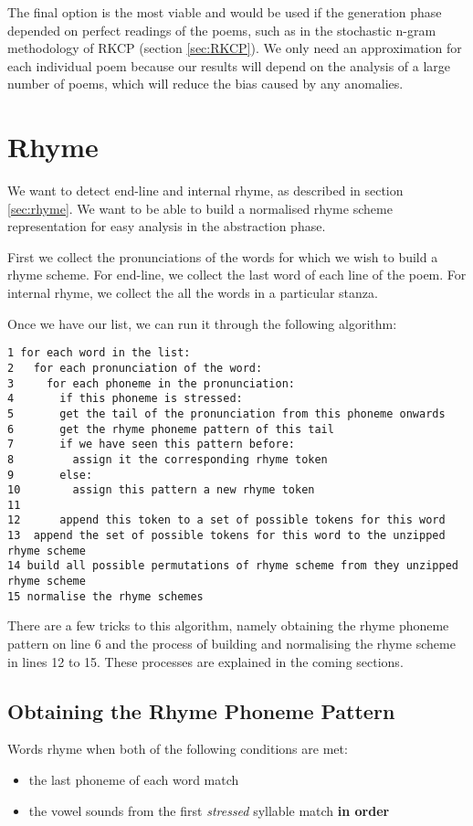 The final option is the most viable and would be used if the generation phase depended on perfect readings of the poems, such as in the stochastic n-gram methodology of RKCP (section \ref{sec:RKCP}). We only need an approximation for each individual poem because our results will depend on the analysis of a large number of poems, which will reduce the bias caused by any anomalies.


\section{Rhyme}

We want to detect end-line and internal rhyme, as described in section \ref{sec:rhyme}. We want to be able to build a normalised rhyme scheme representation for easy analysis in the abstraction phase. 

First we collect the pronunciations of the words for which we wish to build a rhyme scheme. For end-line, we collect the last word of each line of the poem. For internal rhyme, we collect the all the words in a particular stanza.

Once we have our list, we can run it through the following algorithm:

\begin{verbatim}
1 for each word in the list:
2   for each pronunciation of the word:
3     for each phoneme in the pronunciation:
4	    if this phoneme is stressed:
5       get the tail of the pronunciation from this phoneme onwards
6       get the rhyme phoneme pattern of this tail
7       if we have seen this pattern before: 
8         assign it the corresponding rhyme token
9       else:
10        assign this pattern a new rhyme token
11			
12      append this token to a set of possible tokens for this word			
13  append the set of possible tokens for this word to the unzipped rhyme scheme
14 build all possible permutations of rhyme scheme from they unzipped rhyme scheme
15 normalise the rhyme schemes
\end{verbatim}
There are a few tricks to this algorithm, namely obtaining the rhyme phoneme pattern on line 6 and the process of building and normalising the rhyme scheme in lines 12 to 15. These processes are explained in the coming sections.

\subsection{Obtaining the Rhyme Phoneme Pattern}

Words rhyme when both of the following conditions are met:
\begin{itemize}
\item{the last phoneme of each word match}
\item{the vowel sounds from the first \textit{stressed} syllable match \textbf{in order}}
\end{itemize}

